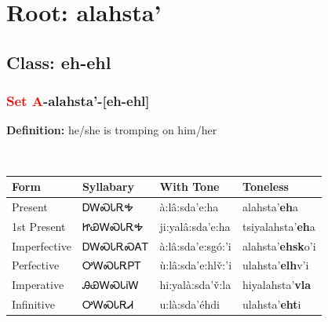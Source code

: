 \needspace{4in}
\section*{Root: alahsta'}
\nopagebreak
{}
\needspace{3in}
\subsection*{Class: eh-ehl}
\nopagebreak
\needspace{2in}
\subsubsection*{\textcolor{Red}{Set A}{-}\textbf{alahsta'}{-}[eh-ehl]}
\nopagebreak
\textbf{Definition: } he/she is tromping on him/her
\\[0.5em]
\begin{tabularx}{\textwidth}{l X X X}%
\toprule%
\textbf{Form}&\textbf{Syllabary}&\textbf{With Tone}&\textbf{Toneless}\\%
\midrule%
Present&ᎠᎳᏍᏓᎡᎭ&à:lâ:sda’e:ha&alahsta'\textbf{eh}a\\%
1st Present&ᏥᏯᎳᏍᏓᎡᎭ&ji:yalâ:sda’e:ha&tsiyalahsta'\textbf{eh}a\\%
Imperfective&ᎠᎳᏍᏓᎡᏍᎪᎢ&à:lâ:sda’e:sgó:’i&alahsta'\textbf{ehsk}o'i\\%
Perfective&ᎤᎳᏍᏓᎡᏢᎢ&ù:lâ:sda’e:hlv̌:’i&ulahsta'\textbf{elh}v'i\\%
Imperative&ᎯᏯᎳᏍᏓᎥᎳ&hi:yalà:sda’v̌:la&hiyalahsta'\textbf{vla}\\%
Infinitive&ᎤᎳᏍᏓᎡᏗ&u:là:sda’éhdi&ulahsta'\textbf{eht}i\\%
\bottomrule%
\end{tabularx}
\\[1em]